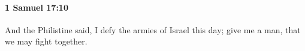 
		\paragraph{1 Samuel 17:10} %
			\label{1SAMUEL-17-10}

			And the Philistine said, I defy the armies of Israel this day; give me a man, that we may fight together.


